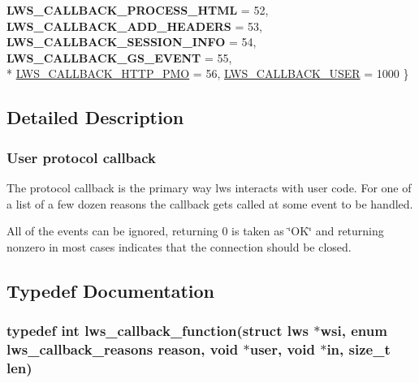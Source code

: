 \begin{DoxyCompactItemize}
{\bfseries L\+W\+S\+\_\+\+C\+A\+L\+L\+B\+A\+C\+K\+\_\+\+P\+R\+O\+C\+E\+S\+S\+\_\+\+H\+T\+ML} = 52, 
{\bfseries L\+W\+S\+\_\+\+C\+A\+L\+L\+B\+A\+C\+K\+\_\+\+A\+D\+D\+\_\+\+H\+E\+A\+D\+E\+RS} = 53, 
{\bfseries L\+W\+S\+\_\+\+C\+A\+L\+L\+B\+A\+C\+K\+\_\+\+S\+E\+S\+S\+I\+O\+N\+\_\+\+I\+N\+FO} = 54, 
{\bfseries L\+W\+S\+\_\+\+C\+A\+L\+L\+B\+A\+C\+K\+\_\+\+G\+S\+\_\+\+E\+V\+E\+NT} = 55, 
\\*
\hyperlink{group__usercb_ggad62860e19975ba4c4af401c3cdb6abf7aa5cc921b7697743017a533822a3d556a}{L\+W\+S\+\_\+\+C\+A\+L\+L\+B\+A\+C\+K\+\_\+\+H\+T\+T\+P\+\_\+\+P\+MO} = 56, 
\hyperlink{group__usercb_ggad62860e19975ba4c4af401c3cdb6abf7a982579753e70e59a9ea13ce628ac891a}{L\+W\+S\+\_\+\+C\+A\+L\+L\+B\+A\+C\+K\+\_\+\+U\+S\+ER} = 1000
 \}
\end{DoxyCompactItemize}


\subsection{Detailed Description}
\subsubsection*{User protocol callback}

The protocol callback is the primary way lws interacts with user code. For one of a list of a few dozen reasons the callback gets called at some event to be handled.

All of the events can be ignored, returning 0 is taken as \char`\"{}\+O\+K\char`\"{} and returning nonzero in most cases indicates that the connection should be closed. 

\subsection{Typedef Documentation}
\subsubsection[{\texorpdfstring{lws\+\_\+callback\+\_\+function}{lws\_callback\_function}}]{\setlength{\rightskip}{0pt plus 5cm}typedef int lws\+\_\+callback\+\_\+function(struct lws $\ast$wsi, enum {\bf lws\+\_\+callback\+\_\+reasons} reason, void $\ast$user, void $\ast$in, size\+\_\+t len)}\hypertarget{group__usercb_gad4fcb82e68d60ffacca61a3f783a0a2f}{}\label{group__usercb_gad4fcb82e68d60ffacca61a3f783a0a2f}


